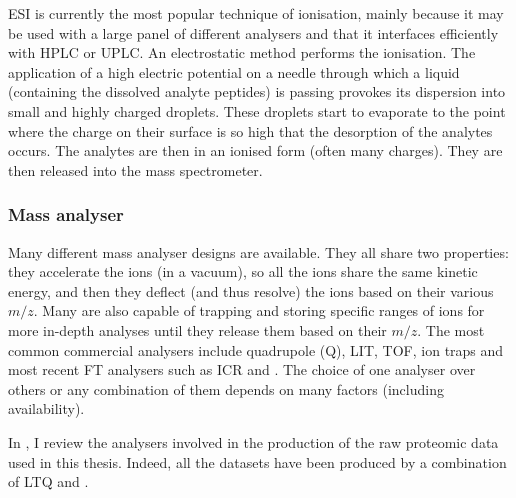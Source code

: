 \gls{ESI} is currently the most popular technique of ionisation, mainly
because it may be used with a large panel of different analysers and that it
interfaces efficiently with \gls{HPLC} or \gls{UPLC}. An electrostatic method
performs the ionisation. The application of a high electric potential on
a needle through which a liquid (containing the dissolved analyte peptides)
is passing provokes its dispersion into small and highly charged droplets.
These droplets start to evaporate to the point where the charge on their surface
is so high that the desorption of the analytes occurs.  The analytes are then
in an ionised form (often many charges). They are then released into the mass
spectrometer. 

\subsubsection{Mass analyser}

Many different mass analyser designs are available. They all share two properties:
they accelerate the ions (in a vacuum), so all the ions share the same kinetic
energy, and then they deflect (and thus resolve) the ions based on
their various $m/z$. Many are also
capable of trapping and storing specific ranges of ions for more in-depth analyses until
they release them based on their $m/z$.
The most common commercial analysers include quadrupole (Q), \acrfull{LIT},
\acrfull{TOF}, ion traps and most recent \gls{FT} analysers such as \acrfull{ICR}
and \orbi.
The choice of one analyser over others or any combination of them
depends on many factors (including availability).~

In ,
I review the analysers involved in
the production of the raw proteomic data used in this thesis.
Indeed, all the datasets have been
produced by a combination of \acrfull{LTQ} and \orbi.%

